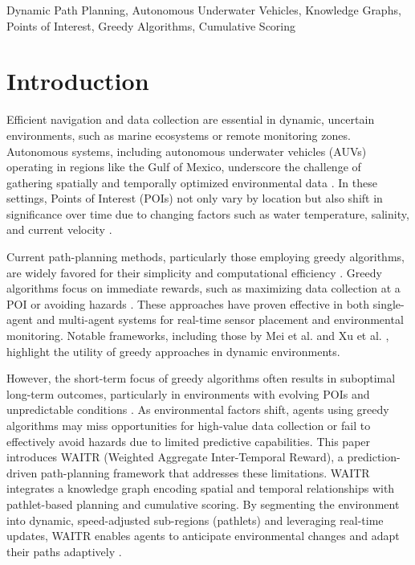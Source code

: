 \documentclass[conference]{IEEEtran}
\begin{document}
\begin{IEEEkeywords}
Dynamic Path Planning, Autonomous Underwater Vehicles, Knowledge Graphs, Points of Interest, Greedy Algorithms, Cumulative Scoring
\end{IEEEkeywords}

\section{Introduction}

Efficient navigation and data collection are essential in dynamic, uncertain environments, such as marine ecosystems or remote monitoring zones. Autonomous systems, including autonomous underwater vehicles (AUVs) operating in regions like the Gulf of Mexico, underscore the challenge of gathering spatially and temporally optimized environmental data \cite{rudnick2015ocean_research, chassignet2007hycom}. In these settings, Points of Interest (POIs) not only vary by location but also shift in significance over time due to changing factors such as water temperature, salinity, and current velocity \cite{holmberg2014data_visualization}.

Current path-planning methods, particularly those employing greedy algorithms, are widely favored for their simplicity and computational efficiency \cite{xu2020greedy_dynamic}. Greedy algorithms focus on immediate rewards, such as maximizing data collection at a POI or avoiding hazards \cite{mei2024multi_agent}. These approaches have proven effective in both single-agent and multi-agent systems for real-time sensor placement and environmental monitoring. Notable frameworks, including those by Mei et al. \cite{mei2024multi_agent} and Xu et al. \cite{xu2020greedy_dynamic}, highlight the utility of greedy approaches in dynamic environments. 

However, the short-term focus of greedy algorithms often results in suboptimal long-term outcomes, particularly in environments with evolving POIs and unpredictable conditions \cite{wu2014path_problems}. As environmental factors shift, agents using greedy algorithms may miss opportunities for high-value data collection or fail to effectively avoid hazards due to limited predictive capabilities. This paper introduces WAITR (Weighted Aggregate Inter-Temporal Reward), a prediction-driven path-planning framework that addresses these limitations. WAITR integrates a knowledge graph encoding spatial and temporal relationships with pathlet-based planning and cumulative scoring. By segmenting the environment into dynamic, speed-adjusted sub-regions (pathlets) and leveraging real-time updates, WAITR enables agents to anticipate environmental changes and adapt their paths adaptively \cite{lavalle2006planning}.
\end{document}
